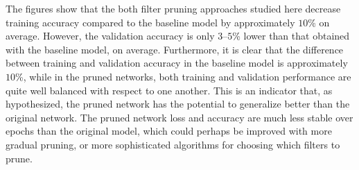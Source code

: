 \documentclass{article}
\begin{document}
The figures show that the both filter pruning approaches studied here decrease training accuracy compared to the baseline model by approximately $10$\% on average. However, the validation accuracy is only $3$--$5$\% lower than that obtained with the baseline model, on average. Furthermore, it is clear that the difference between training and validation accuracy in the baseline model is approximately $10$\%, while in the pruned networks, both training and validation performance are quite well balanced with respect to one another. This is an indicator that, as hypothesized, the pruned network has the potential to generalize better than the original network. The pruned network loss and accuracy are much less stable over epochs than the original model, which could perhaps be improved with more gradual pruning, or more sophisticated algorithms for choosing which filters to prune.
\end{document}

